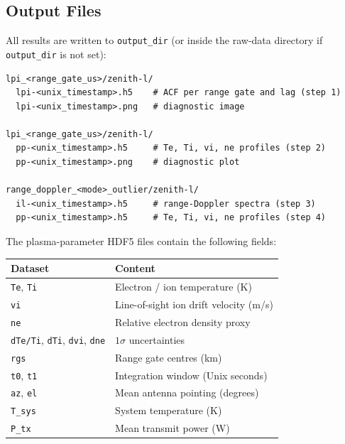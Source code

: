 \subsection{Output Files}

All results are written to \texttt{output\_dir} (or inside the raw-data
directory if \texttt{output\_dir} is not set):

\begin{verbatim}
lpi_<range_gate_us>/zenith-l/
  lpi-<unix_timestamp>.h5    # ACF per range gate and lag (step 1)
  lpi-<unix_timestamp>.png   # diagnostic image

lpi_<range_gate_us>/zenith-l/
  pp-<unix_timestamp>.h5     # Te, Ti, vi, ne profiles (step 2)
  pp-<unix_timestamp>.png    # diagnostic plot

range_doppler_<mode>_outlier/zenith-l/
  il-<unix_timestamp>.h5     # range-Doppler spectra (step 3)
  pp-<unix_timestamp>.h5     # Te, Ti, vi, ne profiles (step 4)
\end{verbatim}

The plasma-parameter HDF5 files contain the following fields:
\begin{center}
\begin{tabular}{ll}
\hline
\textbf{Dataset} & \textbf{Content} \\
\hline
\texttt{Te}, \texttt{Ti}     & Electron / ion temperature (K) \\
\texttt{vi}                  & Line-of-sight ion drift velocity (m/s) \\
\texttt{ne}                  & Relative electron density proxy \\
\texttt{dTe/Ti}, \texttt{dTi}, \texttt{dvi}, \texttt{dne} & $1\sigma$ uncertainties \\
\texttt{rgs}                 & Range gate centres (km) \\
\texttt{t0}, \texttt{t1}     & Integration window (Unix seconds) \\
\texttt{az}, \texttt{el}     & Mean antenna pointing (degrees) \\
\texttt{T\_sys}              & System temperature (K) \\
\texttt{P\_tx}               & Mean transmit power (W) \\
\hline
\end{tabular}
\end{center}
